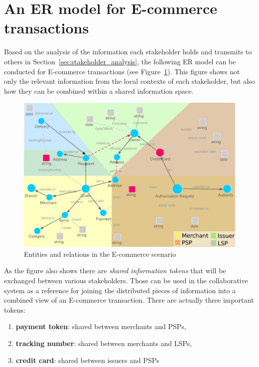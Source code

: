 
\section{An \gls{ER} model for \gls{E-commerce} transactions}
\label{sec:data_model_transactions}

Based on the analysis of the information each stakeholder holds and transmits to others in Section~\ref{sec:stakeholder_analysis}, the following \gls{ER} model can be conducted for \gls{E-commerce} transactions (see Figure~\ref{fig:images_data_model}). This figure shows not only the relevant information from the local contexts of each stakeholder, but also how they can be combined within a shared information space. \\

\begin{figure}[!ht]
  \centering
  \includegraphics[width=0.9\columnwidth]{images/ontology_scenario_1.pdf}
  \caption[Entities and relations in the \gls{E-commerce} scenario]{Entities and relations in the \gls{E-commerce} scenario}
\label{fig:images_data_model}
\end{figure}

As the figure also shows there are \emph{shared information tokens} that will be exchanged between various stakeholders. Those can be used in the collaborative system as a reference for joining the distributed pieces of information into a combined view of an \gls{E-commerce} transaction. There are actually three important tokens: \@

\begin{enumerate}
  \item \textbf{payment token}: shared between merchants and \gls{PSP}s,
  \item \textbf{tracking number}: shared between merchants and \gls{LSP}s,
  \item \textbf{credit card}: shared between issuers and \gls{PSP}s
\end{enumerate}

